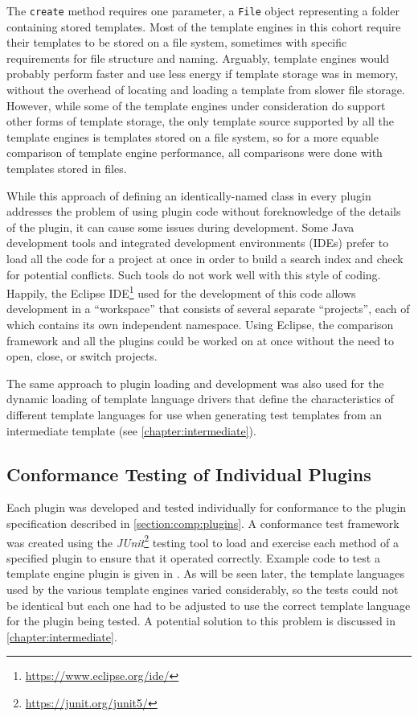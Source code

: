 The \verb!create! method requires one parameter, a \verb!File! object representing a folder containing stored templates. Most of the \gls{template engine}s in this cohort require their templates to be stored on a file system, sometimes with specific requirements for file structure and naming. Arguably, \gls{template engine}s would probably perform faster and use less energy if template storage was in memory, without the overhead of locating and loading a template from slower file storage. However, while some of the \gls{template engine}s under consideration do support other forms of template storage, the only template source supported by all the \gls{template engine}s is templates stored on a file system, so for a more equable comparison of \gls{template engine} performance, all comparisons were done with templates stored in files.

While this approach of defining an identically-named class in every plugin addresses the problem of using plugin code without foreknowledge of the details of the plugin, it can cause some issues during development. Some Java development tools and integrated development environments (IDEs) prefer to load all the code for a project at once in order to build a search index and check for potential conflicts. Such tools do not work well with this style of coding. Happily, the Eclipse IDE\footnote{\url{https://www.eclipse.org/ide/}} used for the development of this code allows development in a \enquote{workspace} that consists of several separate \enquote{projects}, each of which contains its own independent namespace. Using Eclipse, the comparison framework and all the plugins could be worked on at once without the need to open, close, or switch projects.

The same approach to plugin loading and development was also used for the dynamic loading of \gls{template language} drivers that define the characteristics of different \gls{template language}s for use when generating test templates from an intermediate template (see \autoref{chapter:intermediate}).

\subsection{Conformance Testing of Individual Plugins}
\label{section:comp:testing}

Each plugin was developed and tested individually for conformance to the plugin specification described in \autoref{section:comp:plugins}. A conformance test framework was created using the \emph{JUnit}\footnote{\url{https://junit.org/junit5/}} testing tool to load and exercise each method of a specified plugin to ensure that it operated correctly. Example code to test a \gls{template engine} plugin is given in . As will be seen later, the \gls{template language}s used by the various \gls{template engine}s varied considerably, so the tests could not be identical but each one had to be adjusted to use the correct \gls{template language} for the plugin being tested. A potential solution to this problem is discussed in \autoref{chapter:intermediate}.

